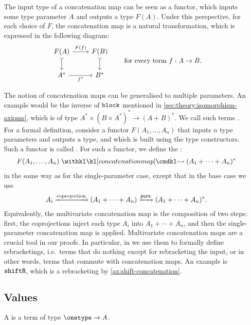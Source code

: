 The input type of a concatenation map can be seen as a functor, which inputs some type parameter $A$ and outputs a type $F(A)$. Under this perspective, for each choice of $F$, the concatenation map is a natural transformation, which is expressed in the following diagram:
\[
    \begin{tikzcd}
        F(A)
        \ar[r,"F(f)"]
        \ar[d,\concar]
        &
        F(B)
        \ar[d,\concar]
        \\
        A^*
        \ar[r,"{f^*}"']
        &
        B^*
    \end{tikzcd}
    \qquad \text{for every term $f: A \to B$.}
\]

The notion of concatenation maps can be generalised to multiple parameters. An example would be the inverse of $\mathtt{block}$ mentioned in \cref{sec:theory:isomorphism-axioms}, which is of type $A^* \times (B \times A^*)^* \to
(A+B)^*$. We call such terms .
For a formal definition, consider a functor $F(A_1, \dots, A_n)$ that inputs $n$ type parameters and outputs a type, and which is built using the type constructors. Such a functor is called . For such a functor, we define the :
\begin{align*}
F(A_1,\ldots,A_n) \concmap (A_1 + \cdots + A_n)^*
\end{align*}
in the same way as for the single-parameter case, except that in the base case we use
\begin{align*}
A_i \xrightarrow{\text{coprojection}} (A_1 + \cdots + A_n) \xrightarrow {\mathtt{pure}} (A_1 + \cdots + A_n)^*.
\end{align*}
Equivalently, the multivariate concatenation map is the composition of two steps: first, the coprojections inject each type $A_i$ into $A_1 + \cdots + A_n$, and then the single-parameter concatenation map is applied. Multivariate concatenation maps are a crucial tool in our proofs. In particular, in  we use them to formally define rebracketings, i.e.~terms that do nothing except for rebracketing the input, or in other words, terms that commute with concatenation maps. An example is $\mathtt{shiftR}$, which is a rebracketing by \cref{ax:shift-concatenation}.

\subsection{Values}
\begin{definition}
     \label{def:value}
    A  is a term of type $\onetype  \to A$.
\end{definition}

